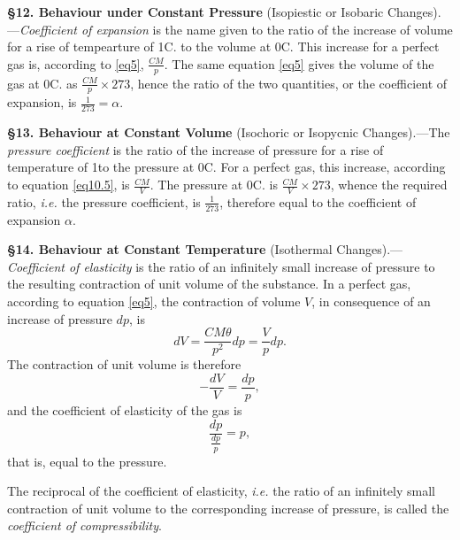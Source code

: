 \documentclass[oneside,12pt]{book}
\begin{document}
\textbf{\S 12. Behaviour under Constant Pressure} (Isopiestic or Isobaric Changes).---\textit{Coefficient of expansion} is the name given to the ratio of the increase of volume for a rise of tempearture of 1\degree C. to the volume at 0\degree C. This increase for a perfect gas is, according to \eqref{eq5}, $\frac{CM}{p}$. The same equation \eqref{eq5} gives the volume of the gas at 0\degree C. as $\frac{CM}{p}\times 273$, hence the ratio of the two quantities, or the coefficient of expansion, is $\frac{1}{273}=\alpha$. \par

\textbf{\S 13. Behaviour at Constant Volume} (Isochoric or Isopycnic Changes).---The \textit{pressure coefficient} is the ratio of the increase of pressure for a rise of temperature of 1\degree to the pressure at 0\degree C. For a perfect gas, this increase, according to equation \eqref{eq10.5}, is $\frac{CM}{V}$. The pressure at 0\degree C. is $\frac{CM}{V}\times 273$, whence the required ratio, \textit{i.e.} the pressure coefficient, is $\frac{1}{273}$, therefore equal to the coefficient of expansion $\alpha$. \par

\textbf{\S 14. Behaviour at Constant Temperature} (Isothermal Changes).---\textit{Coefficient of elasticity} is the ratio of an infinitely small increase of pressure to the resulting contraction of unit volume of the substance. In a perfect gas, according to equation \eqref{eq5}, the contraction of volume $V$, in consequence of an increase of pressure $dp$, is
\begin{equation*}
    dV=\frac{CM\theta}{p^2}dp=\frac{V}{p}dp.
\end{equation*}
The contraction of unit volume is therefore
\begin{equation*}
    -\frac{dV}{V}=\frac{dp}{p},
\end{equation*}
and the coefficient of elasticity of the gas is
\begin{equation*}
    \frac{dp}{\frac{dp}{p}}=p,
\end{equation*}
that is, equal to the pressure. \par

The reciprocal of the coefficient of elasticity, \textit{i.e.} the ratio of an infinitely small contraction of unit volume to the corresponding increase of pressure, is called the \textit{coefficient of compressibility}. \par
\end{document}
